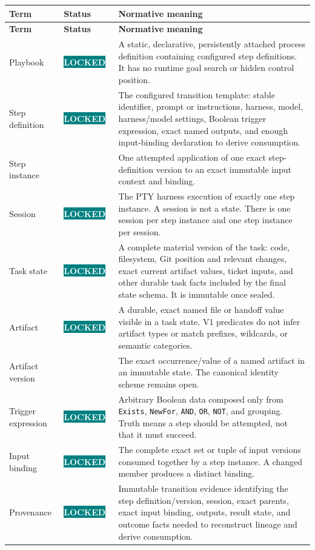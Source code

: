 \documentclass[11pt]{article}
\newcommand{\statuspill}[2]{%
  \begingroup\setlength{\fboxsep}{3pt}%
  \colorbox{#1}{\textcolor{white}{\sffamily\bfseries\scriptsize #2}}%
  \endgroup}
\newcommand{\Locked}{\statuspill{Teal}{LOCKED}}
\newcommand{\Derived}{\statuspill{Accent}{DERIVED}}
\newcommand{\artifact}[1]{\texttt{#1}}
\begin{document}
\begin{longtable}{@{}L{1.25in}L{0.78in}L{4.52in}@{}}
\toprule
\textbf{Term} & \textbf{Status} & \textbf{Normative meaning} \\
\midrule
\endfirsthead
\toprule
\textbf{Term} & \textbf{Status} & \textbf{Normative meaning} \\
\midrule
\endhead
Playbook & \Locked & A static, declarative, persistently attached process definition containing configured step definitions. It has no runtime goal search or hidden control position. \\
Step definition & \Locked & The configured transition template: stable identifier, prompt or instructions, harness, model, harness/model settings, Boolean trigger expression, exact named outputs, and enough input-binding declaration to derive consumption. \\
Step instance & \Derived & One attempted application of one exact step-definition version to an exact immutable input context and binding. \\
Session & \Locked & The PTY harness execution of exactly one step instance. A session is not a state. There is one session per step instance and one step instance per session. \\
Task state & \Locked & A complete material version of the task: code, filesystem, Git position and relevant changes, exact current artifact values, ticket inputs, and other durable task facts included by the final state schema. It is immutable once sealed. \\
Artifact & \Locked & A durable, exact named file or handoff value visible in a task state. V1 predicates do not infer artifact types or match prefixes, wildcards, or semantic categories. \\
Artifact version & \Derived & The exact occurrence/value of a named artifact in an immutable state. The canonical identity scheme remains open. \\
Trigger expression & \Locked & Arbitrary Boolean data composed only from \artifact{Exists}, \artifact{NewFor}, \texttt{AND}, \texttt{OR}, \texttt{NOT}, and grouping. Truth means a step should be attempted, not that it must succeed. \\
Input binding & \Locked & The complete exact set or tuple of input versions consumed together by a step instance. A changed member produces a distinct binding. \\
Provenance & \Locked & Immutable transition evidence identifying the step definition/version, session, exact parents, exact input binding, outputs, result state, and outcome facts needed to reconstruct lineage and derive consumption. \\

\end{longtable}
\end{document}
